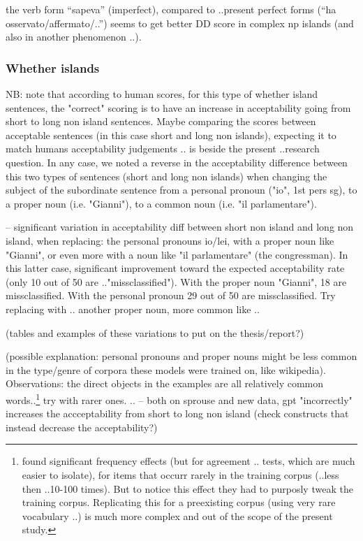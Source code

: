 the verb form “sapeva” (imperfect), compared to ..present perfect forms (“ha osservato/affermato/..”) seems to get better DD score in complex np islands (and also in another phenomenon ..).

\subsubsection{Whether islands}
NB: note that according to human scores, for this type of whether island sentences, the "correct" scoring is to have an increase in acceptability going from short to long non island sentences.
Maybe comparing the scores between acceptable sentences (in this case short and long non islands), expecting it to match humans acceptability judgements .. is beside the present ..research question.
In any case, we noted a reverse in the acceptability difference between this two types of sentences (short and long non islands) when changing the subject of the subordinate sentence from a personal pronoun ("io", 1st pers sg), to a proper noun (i.e. "Gianni"), to a common noun (i.e. "il parlamentare").

-- significant variation in acceptability diff between short non island and long non island, when replacing: the personal pronouns io/lei, with a proper noun like "Gianni", or even more with a noun like "il parlamentare" (the congressman). In this latter case, significant improvement toward the expected acceptability rate (only 10 out of 50 are .."missclassified"). With the proper noun "Gianni", 18 are missclassified. With the personal pronoun 29 out of 50 are missclassified.
Try replacing with .. another proper noun, more common like ..


(tables and examples of these variations to put on the thesis/report?)

(possible explanation: personal pronouns and proper nouns might be less common in the type/genre of corpora these models were trained on, like wikipedia).
Observations: the direct objects in the examples are all relatively common words..\footnote{\citet{wei2021frequency} found significant frequency effects (but for agreement .. tests, which are much easier to isolate), for items that occurr rarely in the training corpus (..less then ..10-100 times). But to notice this effect they had to purposly tweak the training corpus. Replicating this for a preexisting corpus (using very rare vocabulary ..) is much more complex and out of the scope of the present study.}
try with rarer ones.
..
-- both on sprouse and new data, gpt "incorrectly" increases the accceptability from short to long non island (check constructs that instead decrease the acceptability?)

